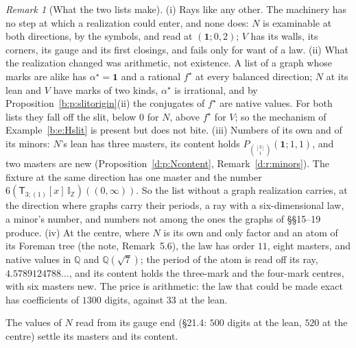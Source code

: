 \documentclass[11pt]{article}
\newcommand{\one}{\mathbf 1}
\newcommand{\sT}{\mathsf T}
\newcommand{\IZ}{\mathbb I_{\mathbb Z}}
\newcommand{\Tx}[3]{(\sT_{#1;(1)}[x]\,#2)((#3,\infty))}
\newcommand{\Pth}{P_{\binom{[3]}1}(\one;1,1)}
\theoremstyle{plain}
\theoremstyle{definition}
\theoremstyle{remark}
\newtheorem{remark}[proposition]{Remark}
\begin{document}
\begin{remark}[What the two lists make]\label{b:r:NV}
(i) Rays like any other. The machinery has no step at which a realization could enter, and none does: $N$ is examinable at both directions, by the symbols, and read at $(\one;0,2)$; $V$ has its walls, its corners, its gauge and its first closings, and fails only for want of a law. (ii) What the realization changed was arithmetic, not existence. A list of a graph whose marks are alike has $\alpha^\star=\one$ and a rational $f^\star$ at every balanced direction; $N$ at its lean and $V$ have marks of two kinds, $\alpha^\star$ is irrational, and by Proposition~\ref{b:p:slitorigin}(ii) the conjugates of $f^\star$ are native values. For both lists they fall off the slit, below $0$ for $N$, above $f^\star$ for $V$; so the mechanism of Example~\ref{b:e:Hslit} is present but does not bite. (iii) Numbers of its own and of its minors: $N$'s lean has three masters, its content holds $\Pth$, and two masters are new (Proposition~\ref{d:p:Ncontent}, Remark~\ref{d:r:minors}). The fixture at the same direction has one master and the number $6\Tx3{\IZ}0$. So the list without a graph realization carries, at the direction where graphs carry their periods, a ray with a six-dimensional law, a minor's number, and numbers not among the ones the graphs of \S\S15--19 produce. (iv) At the centre, where $N$ is its own and only factor and an atom of its Foreman tree (the note, Remark~5.6), the law has order $11$, eight masters, and native values in $\mathbb Q$ and $\mathbb Q(\sqrt7)$; the period of the atom is read off its ray, $4.5789124788\ldots$, and its content holds the three-mark and the four-mark centres, with six masters new. The price is arithmetic: the law that could be made exact has coefficients of $1300$ digits, against $33$ at the lean.
\end{remark}

The values of $N$ read from its gauge end (\S21.4: $500$ digits at the lean, $520$ at the centre) settle its masters and its content.
\end{document}
